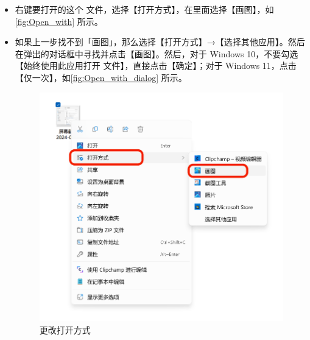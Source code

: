 {{{{\begin{itemize}
  \item 右键要打开的这个  文件，选择【打开方式】，在里面选择【画图】，如\autoref{fig:Open_with} 所示。
  \item 如果上一步找不到「画图」，那么选择【打开方式】→【选择其他应用】。然后在弹出的对话框中寻找并点击【画图】。然后，对于 Windows 10，不要勾选【始终使用此应用打开  文件】，直接点击【确定】；对于 Windows 11，点击【仅一次】，如\autoref{fig:Open_with_dialog} 所示。
    \begin{figure}[htb!]
      \centering
      \begin{minipage}{.55\textwidth}
        \centering
        \includegraphics[width=.98\textwidth]{assets/basic/Open_with.png}
        \caption{更改打开方式}
        \label{fig:Open_with}
      \end{minipage}
      \begin{minipage}{.43\textwidth}

\end{minipage}
\end{figure}
\end{itemize}}}}}
